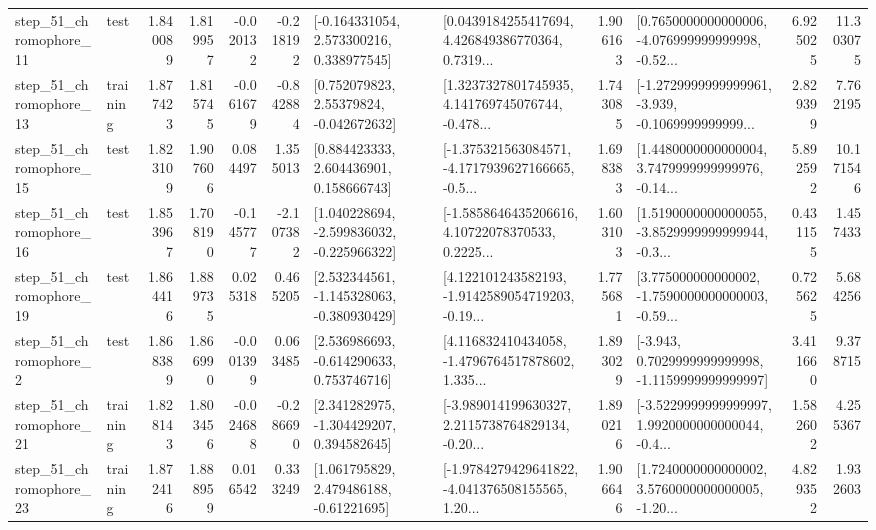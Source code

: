 \begin{tabular}{llrrrrllrlrr}
   step\_51\_chromophore\_11 &      test &      1.840089 &    1.819957 &     -0.020132 & -0.218192 &    [-0.164331054, 2.573300216, 0.338977545] &  [0.0439184255417694, 4.426849386770364, 0.7319... &       1.906163 &  [0.7650000000000006, -4.076999999999998, -0.52... &            6.925025 &         11.303075 \\
   step\_51\_chromophore\_13 &  training &      1.877423 &    1.815745 &     -0.061679 & -0.842884 &     [0.752079823, 2.55379824, -0.042672632] &  [1.3237327801745935, 4.141769745076744, -0.478... &       1.743085 &  [-1.2729999999999961, -3.939, -0.1069999999999... &            2.829399 &          7.762195 \\
   step\_51\_chromophore\_15 &      test &      1.823109 &    1.907606 &      0.084497 &  1.355013 &     [0.884423333, 2.604436901, 0.158666743] &  [-1.375321563084571, -4.1717939627166665, -0.5... &       1.698383 &  [1.4480000000000004, 3.7479999999999976, -0.14... &            5.892592 &         10.171546 \\
   step\_51\_chromophore\_16 &      test &      1.853967 &    1.708190 &     -0.145777 & -2.107382 &   [1.040228694, -2.599836032, -0.225966322] &  [-1.5858646435206616, 4.10722078370533, 0.2225... &       1.603103 &  [1.5190000000000055, -3.8529999999999944, -0.3... &            0.431155 &          1.457433 \\
   step\_51\_chromophore\_19 &      test &      1.864416 &    1.889735 &      0.025318 &  0.465205 &   [2.532344561, -1.145328063, -0.380930429] &  [4.122101243582193, -1.9142589054719203, -0.19... &       1.775681 &  [3.775000000000002, -1.7590000000000003, -0.59... &            0.725625 &          5.684256 \\
    step\_51\_chromophore\_2 &      test &      1.868389 &    1.866990 &     -0.001399 &  0.063485 &    [2.536986693, -0.614290633, 0.753746716] &  [4.116832410434058, -1.4796764517878602, 1.335... &       1.893029 &  [-3.943, 0.7029999999999998, -1.1159999999999997] &            3.411660 &          9.378715 \\
   step\_51\_chromophore\_21 &  training &      1.828143 &    1.803456 &     -0.024688 & -0.286690 &    [2.341282975, -1.304429207, 0.394582645] &  [-3.989014199630327, 2.2115738764829134, -0.20... &       1.890216 &  [-3.5229999999999997, 1.9920000000000044, -0.4... &            1.582602 &          4.255367 \\
   step\_51\_chromophore\_23 &  training &      1.872416 &    1.888959 &      0.016542 &  0.333249 &     [1.061795829, 2.479486188, -0.61221695] &  [-1.9784279429641822, -4.041376508155565, 1.20... &       1.906646 &  [1.7240000000000002, 3.5760000000000005, -1.20... &            4.829352 &          1.932603 \\

\end{tabular}

